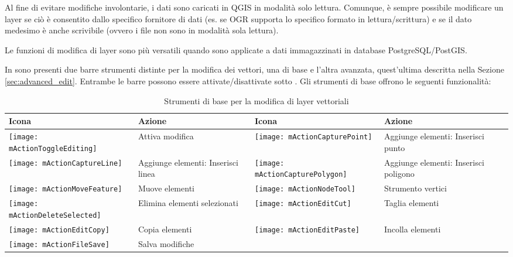 Al fine di evitare modifiche involontarie, i dati sono caricati in QGIS 
in modalità solo lettura. Comunque, è sempre possibile modificare un layer 
se ciò è consentito dallo specifico fornitore di dati (es. se OGR supporta 
lo specifico formato in lettura/scrittura) e se il dato medesimo è anche 
scrivibile (ovvero i file non sono in modalità sola lettura).

Le funzioni di modifica di layer sono più versatili quando sono applicate a
dati immagazzinati in database PostgreSQL/PostGIS. 

In \qg sono presenti due barre strumenti distinte per la modifica dei vettori, 
una di base e l'altra avanzata, quest'ultima descritta nella Sezione \ref{sec:advanced_edit}. 
Entrambe le barre possono essere attivate/disattivate sotto 
 \arrow {}.
Gli strumenti di base offrono le seguenti funzionalità:

\begin{table}[ht]
\centering
\begin{tabular}{|l|p{5.5cm}|l|p{5.5cm}|}
\hline \textbf{Icona} & \textbf{Azione} & \textbf{Icona} & \textbf{Azione} \\
\hline \texttt{[image: mActionToggleEditing]}
   & Attiva modifica
   & \texttt{[image: mActionCapturePoint]}
   & Aggiunge elementi: Inserisci punto \\
\hline \texttt{[image: mActionCaptureLine]}
   & Aggiunge elementi: Inserisci linea 
   & \texttt{[image: mActionCapturePolygon]}
   & Aggiunge elementi: Inserisci poligono  \\
\hline \texttt{[image: mActionMoveFeature]}
   & Muove elementi
   & \texttt{[image: mActionNodeTool]}
   & Strumento vertici \\
\hline \texttt{[image: mActionDeleteSelected]}
   & Elimina elementi selezionati
   & \texttt{[image: mActionEditCut]}
   & Taglia elementi \\
\hline \texttt{[image: mActionEditCopy]}
   & Copia elementi 
   & \texttt{[image: mActionEditPaste]}
   & Incolla elementi \\
\hline \texttt{[image: mActionFileSave]}
   & Salva modifiche
   &  &  \\
\hline
\end{tabular}
\caption{Strumenti di base per la modifica di layer vettoriali}\label{tab:vector_editing}\medskip
\end{table}

